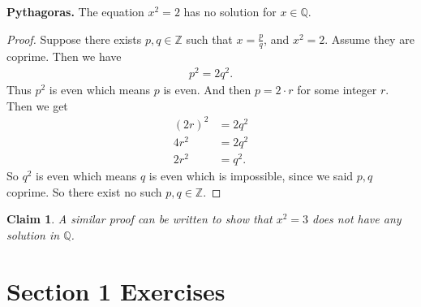 \documentclass[12pt]{amsbook}
\theoremstyle{plain}
\newtheorem*{Claim}{Claim}
\numberwithin{section}{chapter}
\numberwithin{equation}{chapter}
\theoremstyle{definition}
\theoremstyle{remark}
\theoremstyle{plain}
\newcommand{\z}{\mathbb{Z}}
\newcommand{\Q}{\mathbb{Q}}
\newcommand{\bee}{\begin{equation}\begin{aligned}}
\newcommand{\eee}{\end{aligned}\end{equation}}
\newcommand{\fracc}{\frac}
\begin{document}
\textbf{Pythagoras.} The equation $x^2 = 2$ has no solution for $x \in \Q$. 

\begin{proof}
Suppose there exists $p,q \in \z$ such that $x = \fracc{p}{q}$, and $x^2 = 2$. Assume they are coprime. Then we have
\bee
p^2 = 2q^2.
\eee
Thus $p^2$ is even which means $p$ is even. And then $p = 2\cdot r$ for some integer $r$. Then we get
\bee
(2r)^2 &= 2q^2\\
4r^2 &= 2q^2\\
2r^2 &= q^2.
\eee
So $q^2$ is even which means $q$ is even which is impossible, since we said $p,q$ coprime. So there exist no such $p,q \in \z$. 
\end{proof}

\begin{Claim}
A similar proof can be written to show that $x^2 = 3$ does not have any solution in $\Q$. 
\end{Claim}








\section*{Section 1 Exercises}
\end{document}
